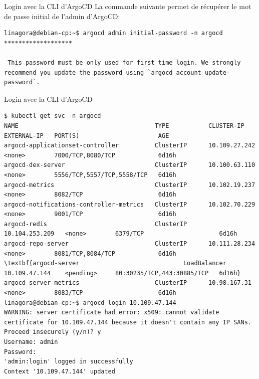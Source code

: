 
\begin{frame}[fragile]{Login avec la CLI d'ArgoCD}
La commande suivante permet de récupérer le mot de passe initial de l'admin d'ArgoCD:

\begin{tiny}
\begin{Verbatim}[commandchars=\\\#\#]
linagora@debian-cp:~$ argocd admin initial-password -n argocd
*******************

 This password must be only used for first time login. We strongly recommend you update the password using `argocd account update-password`.
\end{Verbatim}
\end{tiny}

\end{frame}


\begin{frame}[fragile]{Login avec la CLI d'ArgoCD}

\begin{tiny}
\begin{Verbatim}[commandchars=\\\{\}]
$ kubectl get svc -n argocd
NAME                                      TYPE           CLUSTER-IP       EXTERNAL-IP   PORT(S)                      AGE
argocd-applicationset-controller          ClusterIP      10.109.27.242    <none>        7000/TCP,8080/TCP            6d16h
argocd-dex-server                         ClusterIP      10.100.63.110    <none>        5556/TCP,5557/TCP,5558/TCP   6d16h
argocd-metrics                            ClusterIP      10.102.19.237    <none>        8082/TCP                     6d16h
argocd-notifications-controller-metrics   ClusterIP      10.102.70.229    <none>        9001/TCP                     6d16h
argocd-redis                              ClusterIP      10.104.253.209   <none>        6379/TCP                     6d16h
argocd-repo-server                        ClusterIP      10.111.28.234    <none>        8081/TCP,8084/TCP            6d16h
\textbf{argocd-server                             LoadBalancer   10.109.47.144    <pending>     80:30235/TCP,443:30885/TCP   6d16h}
argocd-server-metrics                     ClusterIP      10.98.167.31     <none>        8083/TCP                     6d16h
linagora@debian-cp:~$ argocd login 10.109.47.144
WARNING: server certificate had error: x509: cannot validate certificate for 10.109.47.144 because it doesn't contain any IP SANs. Proceed insecurely (y/n)? y
Username: admin
Password: 
'admin:login' logged in successfully
Context '10.109.47.144' updated

\end{Verbatim}
\end{tiny}

\end{frame}

